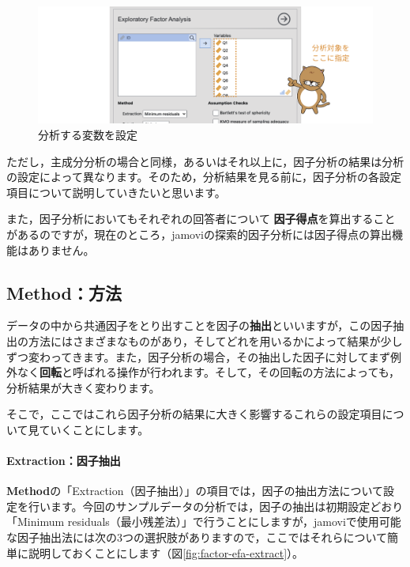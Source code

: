 \documentclass[
  12pt,
  a5jpaper,
  lualatex, ja=standard]{bxjsbook}
\renewcommand{\emph}[1]{\textbf{\color{emph} #1}}
\begin{document}
\begin{figure}[!ht]

{\centering \includegraphics[width=1\linewidth]{images/factor/efa-set-var} 

}

\caption{分析する変数を設定}\label{fig:factor-efa-set-var}
\end{figure}

ただし，主成分分析の場合と同様，あるいはそれ以上に，因子分析の結果は分析の設定によって異なります。そのため，分析結果を見る前に，因子分析の各設定項目について説明していきたいと思います。

また，因子分析においてもそれぞれの回答者について\emph{因子得点}を算出することがあるのですが，現在のところ，jamoviの探索的因子分析には因子得点の算出機能はありません。

\hypertarget{subsub:factor-efa-method}{%
\subsection*{Method：方法}\label{subsub:factor-efa-method}}

データの中から共通因子をとり出すことを因子の\textbf{抽出}といいますが，この因子抽出の方法にはさまざまなものがあり，そしてどれを用いるかによって結果が少しずつ変わってきます。また，因子分析の場合，その抽出した因子に対してまず例外なく\textbf{回転}と呼ばれる操作が行われます。そして，その回転の方法によっても，分析結果が大きく変わります。

そこで，ここではこれら因子分析の結果に大きく影響するこれらの設定項目について見ていくことにします。

\hypertarget{subsub:factor-fa-extraction}{%
\paragraph*{Extraction：因子抽出}\label{subsub:factor-fa-extraction}}

\textbf{Method}の「Extraction（因子抽出）」の項目では，因子の抽出方法について設定を行います。今回のサンプルデータの分析では，因子の抽出は初期設定どおり「Minimum residuals（最小残差法）」で行うことにしますが，jamoviで使用可能な因子抽出法には次の3つの選択肢がありますので，ここではそれらについて簡単に説明しておくことにします（図\ref{fig:factor-efa-extract}）。
\end{document}
